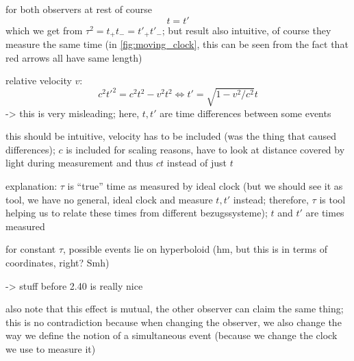 \begin{ex}\label{ex:mov_obs}
for both observers at rest of course
\begin{equation*}
t = t'
\end{equation*}
which we get from $\tau^2 = t_+ t_- = t'_+ t'_-$; but result also intuitive, of course they measure the same time (in \ref{fig:moving_clock}, this can be seen from the fact that red arrows all have same length)

relative velocity $v$:
\begin{equation*}
c^2 t'^2 = c^2 t^2 - v^2 t^2 \Leftrightarrow t' = \sqrt{1 - v^2 / c^2} t %
\end{equation*}
-> this is very misleading; here, $t, t'$ are time differences between some events

this should be intuitive, velocity has to be included (was the thing that caused differences); $c$ is included for scaling reasons, have to look at distance covered by light during measurement and thus $c t$ instead of just $t$

explanation: $\tau$ is \enquote{true} time as measured by ideal clock (but we should see it as tool, we have no general, ideal clock and measure $t, t'$ instead; therefore, $\tau$ is tool helping us to relate these times from different bezugssysteme); $t$ and $t'$ are times measured


for constant $\tau$, possible events lie on hyperboloid (hm, but this is in terms of coordinates, right? Smh)

-> stuff before 2.40 is really nice



also note that this effect is mutual, the other observer can claim the same thing; this is no contradiction because when changing the observer, we also change the way we define the notion of a simultaneous event (because we change the clock we use to measure it)
\end{ex}









\newpage



